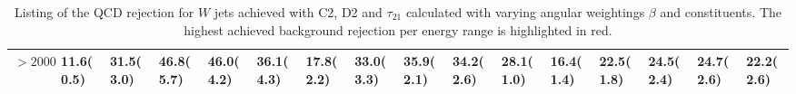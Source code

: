 \begin{table}
{\begin{tabular}{llllllllllllllll}
\multicolumn{1}{l||}{$>2000$} & 	\multicolumn{1}{l|}{11.6(0.5)} & \multicolumn{1}{l|}{31.5(3.0)} & \multicolumn{1}{l|}{\cellcolor{Red!50}46.8(5.7)} 		& \multicolumn{1}{l|}{46.0(4.2)} 					& \multicolumn{1}{l||}{36.1(4.3)} & \multicolumn{1}{l|}{17.8(2.2)} & \multicolumn{1}{l|}{33.0(3.3)} & \multicolumn{1}{l|}{35.9(2.1)} 						& \multicolumn{1}{l|}{34.2(2.6)} & \multicolumn{1}{l||}{28.1(1.0)} & \multicolumn{1}{l|}{16.4(1.4)} & \multicolumn{1}{l|}{22.5(1.8)} & \multicolumn{1}{l|}{24.5(2.4)} & \multicolumn{1}{l|}{24.7(2.6)} & \multicolumn{1}{l|}{22.2(2.6)} \\ \hline
\end{tabular}}
\caption{Listing of the QCD rejection for $W$ jets achieved with C2, D2 and $\tau_{21}$ calculated with varying angular weightings $\beta$ and constituents. The highest achieved background rejection per energy range is highlighted in red.}\label{table:w_scan}
\end{table}

\FloatBarrier
